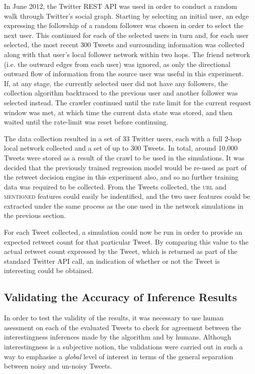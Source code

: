 In June 2012, the Twitter REST API was used in order to conduct a random walk through Twitter's social graph. Starting by selecting an initial user, an edge expressing the followship of a random follower was chosen in order to select the next user. This continued for each of the selected users in turn and, for each user selected, the most recent 300 Tweets and surrounding information was collected along with that user's local follower network within two hops. The friend network (i.e. the outward edges from each user) was ignored, as only the directional outward flow of information from the source user was useful in this experiment. If, at any stage, the currently selected user did not have any followers, the collection algorithm backtraced to the previous user and another follower was selected instead. The crawler continued until the rate limit for the current request window was met, at which time the current data state was stored, and then waited until the rate-limit was reset before continuing.

The data collection resulted in a set of 33 Twitter users, each with a full 2-hop local network collected and a set of up to 300 Tweets. In total, around 10,000 Tweets were stored as a result of the crawl to be used in the simulations. It was decided that the previously trained regression model would be re-used as part of the retweet decision engine in this experiment also, and so no further training data was required to be collected. From the Tweets collected, the \textsc{url} and \textsc{mentioned} features could easily be indentified, and the two user features could be extracted under the same process as the one used in the network simulations in the previous section.

For each Tweet collected, a simulation could now be run in order to provide an expected retweet count for that particular Tweet. By comparing this value to the actual retweet count expressed by the Tweet, which is returned as part of the standard Twitter API call, an indication of whether or not the Tweet is interesting could be obtained.



\subsection{Validating the Accuracy of Inference Results}
In order to test the validity of the results, it was necessary to use human asessment on each of the evaluated Tweets to check for agreement between the interestingness inferences made by the algorithm and by humans. Although interestingness is a subjective notion, the validations were carried out in such a way to emphasise a \textit{global} level of interest in terms of the general separation between noisy and un-noisy Tweets.


